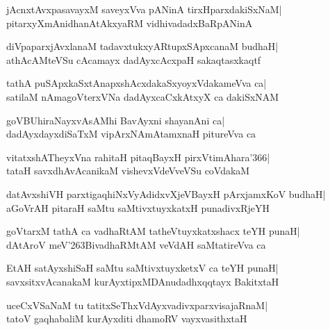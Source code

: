 \documentclass[twoside,12pt,openright]{book}
\def\S{\char'263}
\newcounter{shloka}[chapter]
\begin{document}
\begin{shloka}%
jAcnxtAvxpasavayxM saveyxVva pANinA tirxHparxdakiSxNaM|\\
pitarxyXmAnidhanAtAkxyaRM vidhivadadxBaRpANinA
\end{shloka}

\begin{shloka}%
diVpaparxjAvxlanaM tadavxtukxyARtupxSApxcanaM budhaH|\\
athAcAMteVSu cAcamayx dadAyxcAcxpaH sakaqtasxkaqtf
\end{shloka}

\begin{shloka}%
tathA puSApxkaSxtAnapxshAcxdakaSxyoyxVdakameVva ca|\\
satilaM nAmagoVterxVNa dadAyxcaCxkAtxyX ca dakiSxNAM
\end{shloka}

\begin{shloka}%
goVBUhiraNayxvAsAMhi BavAyxni shayanAni ca|\\
dadAyxdayxdiSaTxM vipArxNAmAtamxnaH pitureVva ca
\end{shloka}

\begin{shloka}%
vitatxshATheyxVna rahitaH pitaqBayxH pirxVtimAhara\char'366|\\
tataH savxdhAvAcanikaM vishevxVdeVveVSu coVdakaM
\end{shloka}

\begin{shloka}%
datAvxshiVH parxtigaqhiNxVyAdidxvXjeVBayxH pArxjamxKoV budhaH|\\
aGoVrAH pitaraH saMtu saMtivxtuyxkatxH punadivxRjeYH
\end{shloka}

\begin{shloka}%
goVtarxM tathA ca vadhaRtAM tatheVtuyxkatxshacx teYH punaH|\\
dAtAroV meV\S BivadhaRMtAM veVdAH saMtatireVva ca
\end{shloka}

\begin{shloka}%
EtAH satAyxshiSaH saMtu saMtivxtuyxketxV ca teYH punaH|\\
savxsitxvAcanakaM kurAyxtipxMDAnudadhxqqtayx BakitxtaH
\end{shloka}

\begin{shloka}%
uceCxVSaNaM tu tatitxSeThxVdAyxvadivxparxvisajaRnaM|\\
tatoV gaqhabaliM kurAyxditi dhamoRV vayxvasithxtaH
\end{shloka}
\end{document}
